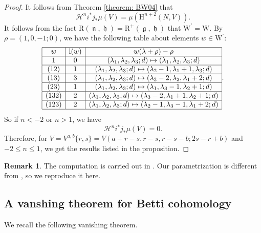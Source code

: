 \documentclass[11pt, a4paper]{amsart}
\theoremstyle{plain}
\theoremstyle{definition}
\newtheorem{remark}[theorem]{Remark}
\numberwithin{equation}{section}
\DeclareMathOperator{\lieg}{\mathfrak g}
\DeclareMathOperator{\lieh}{\mathfrak h}
\DeclareMathOperator{\lien}{\mathfrak n}
\begin{document}
\begin{proof}
It follows from Theorem \ref{theorem: BW04} that 
\begin{equation*}
    \mathcal{H}^{n}i^{*}j_{*}\mu(V) = \mu(\mathrm{H}^{n + 2}(N, V)). 
\end{equation*}
It follows from the fact $\mathrm{R}(\lien, \lieh) = \mathrm{R}^{+}(\lieg, \lieh)$ that $\mathrm{W}^{'} = \mathrm{W}$. By $\rho = (1, 0, -1; 0)$, we have the following table about elements $w \in \mathrm{W}^{'}$: 
\[
\begin{array}{|c|c|c|}
\hline w & \mathrm{l}(w) & w(\lambda + \rho) - \rho \\ 
\hline 1 & 0 & (\lambda_1, \lambda_2, \lambda_3; d) \mapsto (\lambda_1, \lambda_2, \lambda_3; d) \\
\hline (12) & 1 & (\lambda_1, \lambda_2, \lambda_3; d) \mapsto (\lambda_2 - 1, \lambda_1 + 1, \lambda_3; d) \\
\hline (13) & 3 & (\lambda_1, \lambda_2, \lambda_3; d) \mapsto (\lambda_3 - 2, \lambda_2, \lambda_1 + 2; d) \\
\hline (23) & 1 & (\lambda_1, \lambda_2, \lambda_3; d) \mapsto (\lambda_1, \lambda_3 - 1, \lambda_2 + 1; d) \\
\hline (132) & 2 & (\lambda_1, \lambda_2, \lambda_3; d) \mapsto (\lambda_3 - 2, \lambda_1 + 1, \lambda_2 + 1; d) \\
\hline (123) & 2 & (\lambda_1, \lambda_2, \lambda_3; d) \mapsto (\lambda_2 - 1, \lambda_3 - 1, \lambda_1 + 2; d) \\
\hline
\end{array}. 
\]
So if $n < -2$ or $n > 1$, we have 
\begin{equation*}
    \mathcal{H}^{n}i^{*}j_{*}\mu(V) = 0. 
\end{equation*}
Therefore, for $V = V^{a, b} \{r, s \} = V(a + r - s, r - s, r - s - b; 2s - r + b) $ and $ -2 \le n \le 1$, we get the results listed in the proposition. 
\end{proof}

\begin{remark}
    The computation is carried out in \cite[\S 4]{Anc17}. Our parametrization is different from \cite{Anc17}, so we reproduce it here. 
\end{remark}

\subsection{A vanshing theorem for Betti cohomology}
\label{SS: interior and boundary cohomologies}
We recall the following vanishing theorem.
\end{document}
